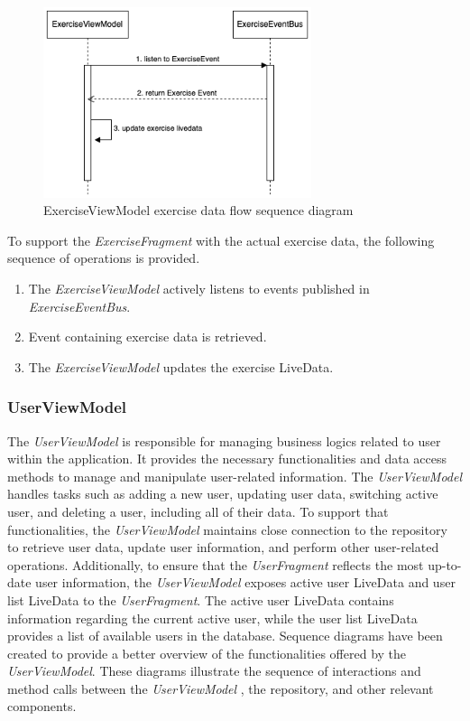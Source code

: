 \begin{figure}[H]
    \centering
    \includegraphics[width=0.7\textwidth]{diagrams/exercise-view-model-seq.drawio.png}
    \caption{ExerciseViewModel exercise data flow sequence diagram}
    \label{fig:exerciseviewmodel_exercisedata}
\end{figure}
To support the \emph{ExerciseFragment} with the actual exercise data, the following sequence of operations is provided.
\begin{enumerate}
    \item The \emph{ExerciseViewModel} actively listens to events published in \emph{ExerciseEventBus}.
    \item Event containing exercise data is retrieved.
    \item The \emph{ExerciseViewModel} updates the exercise LiveData.
\end{enumerate}

\subsubsection{UserViewModel}
The \emph{UserViewModel} is responsible for managing business logics related to user within the application.
It provides the necessary functionalities and data access methods to manage and manipulate user-related information. 
The \emph{UserViewModel} handles tasks such as adding a new user, updating user data, switching active user, and deleting a user, including all of their data.
To support that functionalities, the \emph{UserViewModel} maintains close connection to the repository to retrieve user data, update user information, and perform other user-related operations. 
Additionally, to ensure that the \emph{UserFragment} reflects the most up-to-date user information, the \emph{UserViewModel} exposes active user LiveData and user list LiveData to the \emph{UserFragment}.
The active user LiveData contains information regarding the current active user, while the user list LiveData provides a list of available users in the database.
Sequence diagrams have been created to provide a better overview of the functionalities offered by the \emph{UserViewModel}. These diagrams illustrate the sequence of interactions and method calls between the \emph{UserViewModel} , the repository, and other relevant components.

